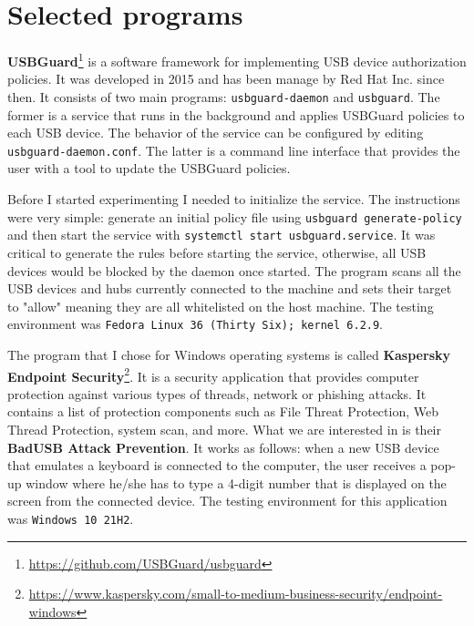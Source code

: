 \section{Selected programs}
\label{sec:defense_selected_programs}
\textbf{USBGuard}\footnote{\url{https://github.com/USBGuard/usbguard}} is a software framework for implementing USB device authorization policies. It was developed in 2015 and has been manage by Red Hat Inc. since then. It consists of two main programs: \verb|usbguard-daemon| and \verb|usbguard|. The former is a service that runs in the background and applies USBGuard policies to each USB device. The behavior of the service can be configured by editing \verb|usbguard-daemon.conf|. The latter is a command line interface that provides the user with a tool to update the USBGuard policies.

Before I started experimenting I needed to initialize the service. The instructions were very simple: generate an initial policy file using \verb|usbguard generate-policy| and then start the service with \verb|systemctl start usbguard.service|. It was critical to generate the rules before starting the service, otherwise, all USB devices would be blocked by the daemon once started. The program scans all the USB devices and hubs currently connected to the machine and sets their target to "allow" meaning they are all whitelisted on the host machine. The testing environment was \verb|Fedora Linux 36 (Thirty Six); kernel 6.2.9|.

The program that I chose for Windows operating systems is called \textbf{Kaspersky Endpoint Security}\footnote{\url{https://www.kaspersky.com/small-to-medium-business-security/endpoint-windows}}. It is a security application that provides computer protection against various types of threads, network or phishing attacks. It contains a list of protection components such as File Threat Protection, Web Thread Protection, system scan, and more. What we are interested in is their \textbf{BadUSB Attack Prevention}. It works as follows: when a new USB device that emulates a keyboard is connected to the computer, the user receives a pop-up window where he/she has to type a 4-digit number that is displayed on the screen from the connected device. The testing environment for this application was \verb|Windows 10 21H2|.

